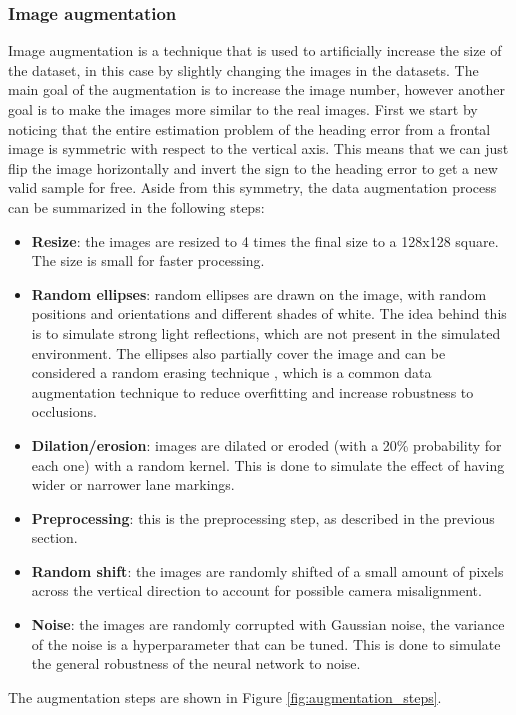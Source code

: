 \documentclass[a4paper,12pt,sort&compress]{article}
\begin{document}
    \subsubsection*{Image augmentation}
    Image augmentation is a technique that is used to artificially increase the size of the dataset,
    in this case by slightly changing the images in the datasets. The main goal of the augmentation
    is to increase the image number, however another goal is to make the images more similar to the
    real images. First we start by noticing that the entire estimation problem of the heading error
    from a frontal image is symmetric with respect to the vertical axis. This means that we can just
    flip the image horizontally and invert the sign to the heading error to get a new valid sample for
    free. Aside from this symmetry, the data augmentation process can be summarized in the following
    steps:
    \begin{itemize}
        \item \textbf{Resize}: the images are resized to 4 times the final size to a 128x128
        square. The size is small for faster processing.
        \item \textbf{Random ellipses}: random ellipses are drawn on the image, with random
        positions and orientations and different shades of white. The idea behind this is to
        simulate strong light reflections, which are not present in the simulated environment. The
        ellipses also partially cover the image and can be considered a random erasing technique
        \citep*{random_erase}, which is a common data augmentation technique to reduce overfitting
        and increase robustness to occlusions. 
        \item \textbf{Dilation/erosion}: images are dilated or eroded (with a 20\% probability for
        each one) with a random kernel. This is done to simulate the effect of having wider or
        narrower lane markings. 
        \item \textbf{Preprocessing}: this is the preprocessing step, as described in the previous
        section. 
        \item \textbf{Random shift}: the images are randomly shifted of a small amount of pixels
        across the vertical direction to account for possible camera misalignment. 
        \item \textbf{Noise}: the images are randomly corrupted with Gaussian noise, the variance
        of the noise is a hyperparameter that can be tuned. This is done to simulate the general
        robustness of the neural network to noise.
    \end{itemize}
    The augmentation steps are shown in Figure \ref{fig:augmentation_steps}.
\end{document}
